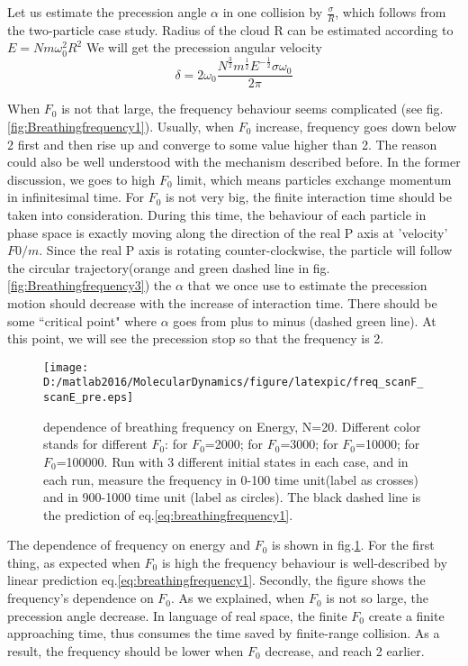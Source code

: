 \documentclass[aps,pre,twocolumn
,groupedaddress]{revtex4-1}
\begin{document}
Let us estimate the precession angle $\alpha$ in one collision by $\frac{\sigma}{R}$, which follows from the two-particle case study. Radius of the cloud R can be estimated according to $E=Nm\omega_0^2R^2$
We will get the precession angular velocity 
\begin{equation}
\delta=2\omega_0\frac{N^\frac{3}{2}m^{\frac{1}{2}}E^{-\frac{1}{2}}\sigma\omega_0}{2\pi}
\label{eq:breathingfrequency1}
\end{equation}





When $F_0$ is not that large, the frequency behaviour seems complicated (see fig.\ref{fig:Breathingfrequency1}). Usually, when $F_0$ increase, frequency goes down below 2 first and then rise up and converge to some value higher than 2. The reason could also be well understood with the mechanism described before. In the former discussion, we goes to high $F_0$ limit, which means particles exchange momentum in infinitesimal time. For $F_0$ is not very big, the finite interaction time should be taken into consideration. During this time, the behaviour of each particle in phase space is exactly moving along the direction of the real P axis at 'velocity' $F0/m$. Since the real P axis is rotating counter-clockwise, the particle will follow the circular trajectory(orange and green dashed line in fig.\ref{fig:Breathingfrequency3}) the $\alpha$ that we once use to estimate the precession motion should decrease with the increase of interaction time. There should be some ``critical point" where $\alpha$ goes from plus to minus (dashed green line). At this point, we will see the precession stop so that the frequency is 2. 


\begin{figure}
\centering
\texttt{[image: D:/matlab2016/MolecularDynamics/figure/latexpic/freq\_scanF\_scanE\_pre.eps]}
\caption{dependence of breathing frequency on Energy, N=20. Different color stands for different $F_0$: {\color{red}{Red}} for $F_0$=2000; {\color{yellow}{Yellow}} for $F_0$=3000; {\color{green}{Green}} for $F_0$=10000;  {\color{blue}{Blue}} for $F_0$=100000. Run with 3 different initial states in each case, and in each run, measure the frequency in 0-100 time unit(label as crosses) and in 900-1000 time unit (label as circles). The black dashed line is the prediction of eq.\ref{eq:breathingfrequency1}.}
\label{fig:Breathingfrequency4}
\end{figure}

The dependence of frequency on energy and $F_0$ is shown in fig.\ref{fig:Breathingfrequency4}. For the first thing, as expected when $F_0$ is high the frequency behaviour is well-described by linear prediction eq.\ref{eq:breathingfrequency1}. Secondly, the figure shows the frequency's dependence on $F_0$. As we explained, when $F_0$ is not so large, the precession angle decrease. In language of real space, the finite $F_0$ create a finite approaching time, thus consumes the time saved by finite-range collision. As a result, the frequency should be lower when $F_0$ decrease, and reach 2 earlier.
\end{document}
